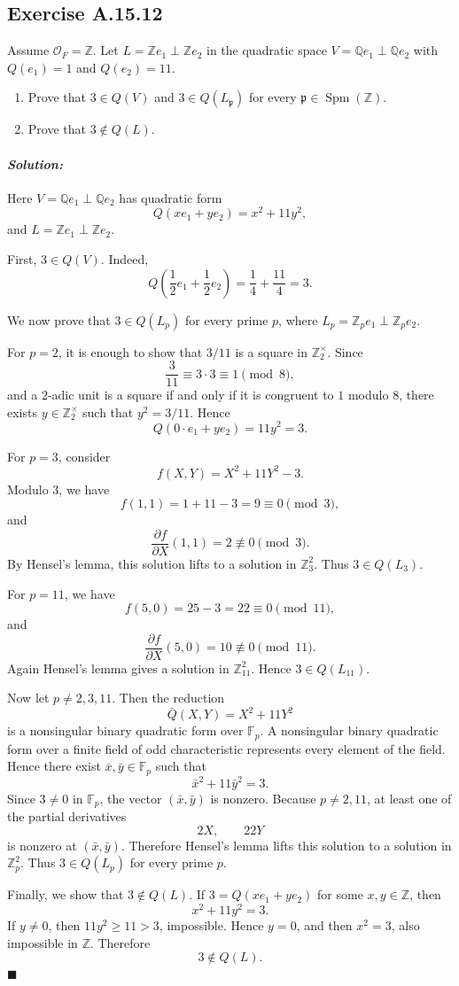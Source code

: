 \documentclass[12pt, a4paper]{article}
\newenvironment{solution}
  {\paragraph{\textit{Solution:}}\par\medskip}
  {\hfill$\blacksquare$\vspace{0.1cm}}
\begin{document}
\subsection*{Exercise A.15.12}
Assume $\mathcal{O}_F = \mathbb{Z}$. Let $L = \mathbb{Z}e_1 \perp \mathbb{Z}e_2$ in the quadratic space $V = \mathbb{Q}e_1 \perp \mathbb{Q}e_2$ with $Q(e_1) = 1$ and $Q(e_2) = 11$.
\begin{enumerate}
    \item Prove that $3 \in Q(V)$ and $3 \in Q(L_{\mathfrak{p}})$ for every $\mathfrak{p} \in \operatorname{Spm}(\mathbb{Z})$.
    \item Prove that $3 \notin Q(L)$.
\end{enumerate}
\begin{solution}
Here \(V=\mathbb Q e_1\perp \mathbb Q e_2\) has quadratic form
\[
Q(xe_1+ye_2)=x^2+11y^2,
\]
and \(L=\mathbb Z e_1\perp \mathbb Z e_2\).

First, \(3\in Q(V)\). Indeed,
\[
Q\left(\frac{1}{2}e_1+\frac{1}{2}e_2\right)
=
\frac{1}{4}+\frac{11}{4}=3.
\]

We now prove that \(3\in Q(L_p)\) for every prime \(p\), where
\(L_p=\mathbb Z_p e_1\perp \mathbb Z_p e_2\).

For \(p=2\), it is enough to show that \(3/11\) is a square in
\(\mathbb Z_2^\times\). Since
\[
\frac{3}{11}\equiv 3\cdot 3\equiv 1 \pmod 8,
\]
and a \(2\)-adic unit is a square if and only if it is congruent to \(1\)
modulo \(8\), there exists \(y\in \mathbb Z_2^\times\) such that
\(y^2=3/11\). Hence
\[
Q(0\cdot e_1+y e_2)=11y^2=3.
\]

For \(p=3\), consider
\[
f(X,Y)=X^2+11Y^2-3.
\]
Modulo \(3\), we have
\[
f(1,1)=1+11-3=9\equiv 0\pmod 3,
\]
and
\[
\frac{\partial f}{\partial X}(1,1)=2\not\equiv 0\pmod 3.
\]
By Hensel's lemma, this solution lifts to a solution in \(\mathbb Z_3^2\).
Thus \(3\in Q(L_3)\).

For \(p=11\), we have
\[
f(5,0)=25-3=22\equiv 0\pmod{11},
\]
and
\[
\frac{\partial f}{\partial X}(5,0)=10\not\equiv 0\pmod{11}.
\]
Again Hensel's lemma gives a solution in \(\mathbb Z_{11}^2\). Hence
\(3\in Q(L_{11})\).

Now let \(p\neq 2,3,11\). Then the reduction
\[
\bar Q(X,Y)=X^2+11Y^2
\]
is a nonsingular binary quadratic form over \(\mathbb F_p\). A nonsingular
binary quadratic form over a finite field of odd characteristic represents
every element of the field. Hence there exist \(\bar x,\bar y\in\mathbb F_p\)
such that
\[
\bar x^2+11\bar y^2=3.
\]
Since \(3\neq 0\) in \(\mathbb F_p\), the vector \((\bar x,\bar y)\) is nonzero.
Because \(p\neq 2,11\), at least one of the partial derivatives
\[
2X,\qquad 22Y
\]
is nonzero at \((\bar x,\bar y)\). Therefore Hensel's lemma lifts this solution
to a solution in \(\mathbb Z_p^2\). Thus \(3\in Q(L_p)\) for every prime \(p\).

Finally, we show that \(3\notin Q(L)\). If \(3=Q(xe_1+ye_2)\) for some
\(x,y\in\mathbb Z\), then
\[
x^2+11y^2=3.
\]
If \(y\neq 0\), then \(11y^2\ge 11>3\), impossible. Hence \(y=0\), and then
\(x^2=3\), also impossible in \(\mathbb Z\). Therefore
\[
3\notin Q(L).
\]
\end{solution}
\end{document}
